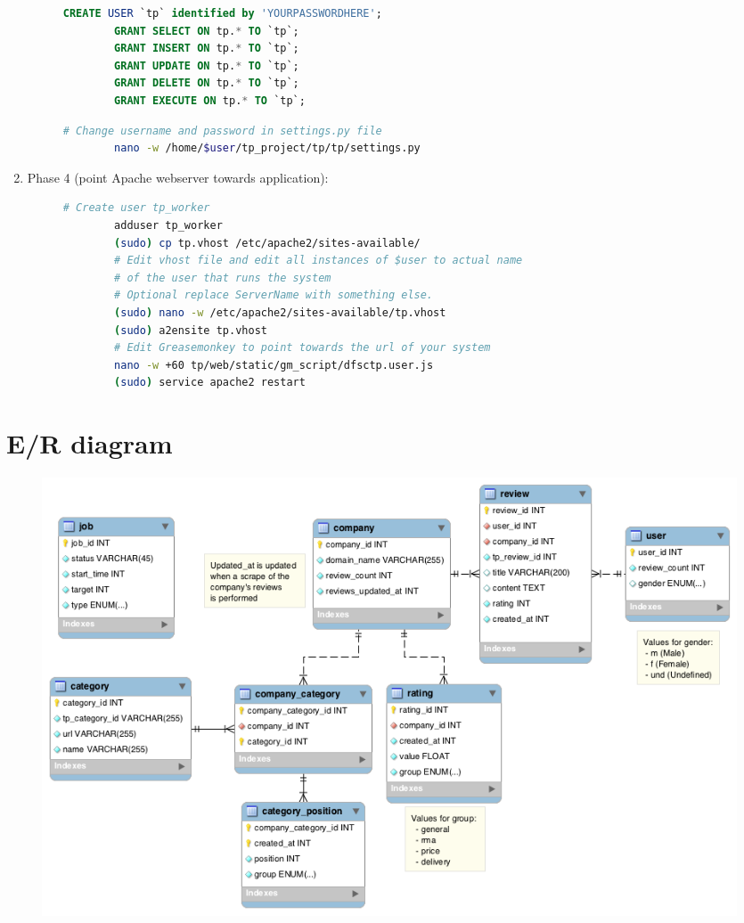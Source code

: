\documentclass[10pt]{IEEEtran}
\begin{document}
\begin{enumerate}
\begin{figure}[h!]
\begin{lstlisting}[language=bash]
	\end{lstlisting}
	\vspace*{-3mm}
	\begin{lstlisting}[language=SQL]
		CREATE USER `tp` identified by 'YOURPASSWORDHERE';
		GRANT SELECT ON tp.* TO `tp`;
		GRANT INSERT ON tp.* TO `tp`;
		GRANT UPDATE ON tp.* TO `tp`;
		GRANT DELETE ON tp.* TO `tp`;
		GRANT EXECUTE ON tp.* TO `tp`;
	\end{lstlisting}
	\vspace*{-3mm}
	\begin{lstlisting}[language=bash]
		# Change username and password in settings.py file
		nano -w /home/$user/tp_project/tp/tp/settings.py
	\end{lstlisting}
	\end{figure}		
	\vspace*{-5mm}
	\item Phase 4 (point Apache webserver towards application):
	\begin{figure}[h!]
	\vspace*{-2mm}	
	\begin{lstlisting}[language=bash]
		# Create user tp_worker
		adduser tp_worker
		(sudo) cp tp.vhost /etc/apache2/sites-available/
		# Edit vhost file and edit all instances of $user to actual name 
		# of the user that runs the system
		# Optional replace ServerName with something else.
		(sudo) nano -w /etc/apache2/sites-available/tp.vhost
		(sudo) a2ensite tp.vhost
		# Edit Greasemonkey to point towards the url of your system
		nano -w +60 tp/web/static/gm_script/dfsctp.user.js
		(sudo) service apache2 restart
	\end{lstlisting}
	\end{figure}	
\end{enumerate}

\newpage
\section{E/R diagram}
\vspace*{10mm}
\begin{figure}[h!]
	\centering
	\includegraphics[scale=0.5]{err_diagram.png}
\end{figure}
\end{document}
